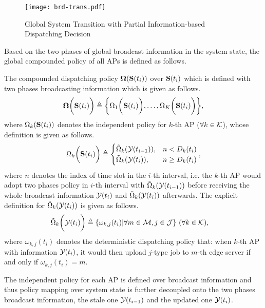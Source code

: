\begin{figure}[ht]
    \centering
    \texttt{[image: brd-trans.pdf]}
    \caption{Global System Transition with Partial Information-based Dispatching Decision}
    \label{fig:brd-trans}
\end{figure}

Based on the two phases of global broadcast information in the system state, the global compounded policy of all APs is defined as follows.
\begin{definition}
    The compounded dispatching policy $\boldsymbol{\Omega}(\mathbf{S}(t_{i}))$ over $\mathbf{S}(t_{i})$ which is defined with two phases broadcasting information which is given as follows.
    \begin{align}
        \boldsymbol{\Omega}\bigg(\mathbf{S}(t_{i})\bigg) \triangleq \bigg\{
            \Omega_{1}\bigg(\mathbf{S}(t_{i})\bigg), \dots, \Omega_{K}\bigg(\mathbf{S}(t_{i})\bigg)
        \bigg\},
    \end{align}
    where
    $\Omega_{k}(\mathbf{S}(t_{i}))$ denotes the independent policy for $k$-th AP ($\forall k\in\mathcal{K}$), whose definition is given as follows.
    \begin{align}
        \Omega_{k}\bigg(\mathbf{S}(t_{i})\bigg) \triangleq
        \begin{cases}
            \tilde{\Omega}_{k}( \mathcal{Y}(t_{i-1}) ), &n < D_{k}(t_{i})
            \\
            \tilde{\Omega}_{k}( \mathcal{Y}(t_{i}) ), &n \geq D_{k}(t_{i})
        \end{cases},
    \end{align}
    where $n$ denotes the index of time slot in the $i$-th interval, i.e. the $k$-th AP would adopt two phases policy in $i$-th interval with $\tilde{\Omega}_{k}(\mathcal{Y}(t_{i-1}))$ before receiving the whole broadcast information $\mathcal{Y}(t_{i})$ and $\tilde{\Omega}_{k}(\mathcal{Y}(t_{i}))$ afterwards.
    The explicit definition for $\tilde{\Omega}_{k}( \mathcal{Y}(t_{i}) )$ is given as follows.
    \begin{align}
        &\tilde{\Omega}_{k}\bigg(\mathcal{Y}(t_{i})\bigg) \triangleq \{\omega_{k,j}(t_{i})|\forall m\in\mathcal{M}, j\in\mathcal{J}\}
        ~(\forall k\in\mathcal{K}),
        \label{def_action}
    \end{align}
    where $\omega_{k,j}(t_{i})$ denotes the deterministic dispatching policy that: when $k$-th AP with information $\mathcal{Y}(t_{i})$, it would then upload $j$-type job to $m$-th edge server if and only if $\omega_{k,j}(t_{i})=m$.
    
\end{definition}
The independent policy for each AP is defined over broadcast information and thus policy mapping over system state is further decoupled onto the two phases broadcast information, the stale one $\mathcal{Y}(t_{i-1})$ and the updated one $\mathcal{Y}(t_{i})$.


